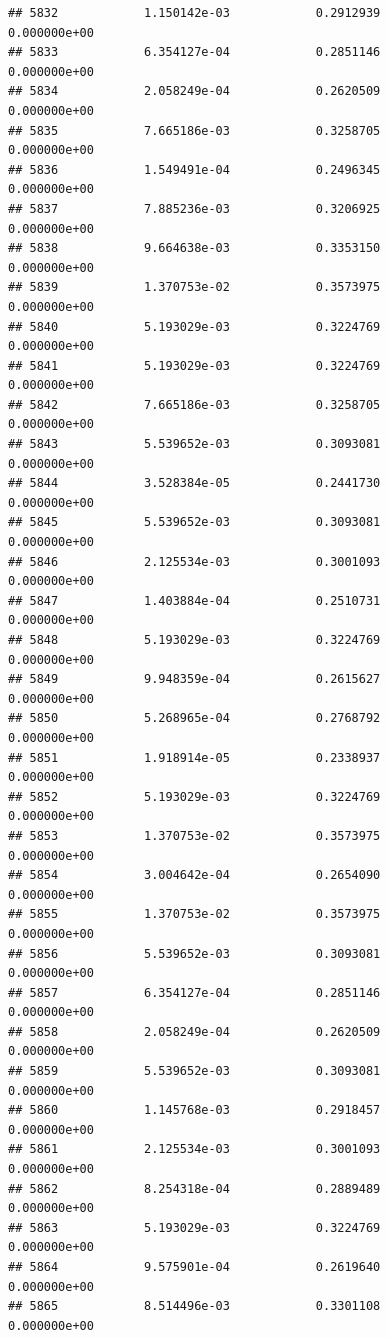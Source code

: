 \documentclass[
]{article}
\begin{document}
\begin{verbatim}
## 5832            1.150142e-03            0.2912939            0.000000e+00
## 5833            6.354127e-04            0.2851146            0.000000e+00
## 5834            2.058249e-04            0.2620509            0.000000e+00
## 5835            7.665186e-03            0.3258705            0.000000e+00
## 5836            1.549491e-04            0.2496345            0.000000e+00
## 5837            7.885236e-03            0.3206925            0.000000e+00
## 5838            9.664638e-03            0.3353150            0.000000e+00
## 5839            1.370753e-02            0.3573975            0.000000e+00
## 5840            5.193029e-03            0.3224769            0.000000e+00
## 5841            5.193029e-03            0.3224769            0.000000e+00
## 5842            7.665186e-03            0.3258705            0.000000e+00
## 5843            5.539652e-03            0.3093081            0.000000e+00
## 5844            3.528384e-05            0.2441730            0.000000e+00
## 5845            5.539652e-03            0.3093081            0.000000e+00
## 5846            2.125534e-03            0.3001093            0.000000e+00
## 5847            1.403884e-04            0.2510731            0.000000e+00
## 5848            5.193029e-03            0.3224769            0.000000e+00
## 5849            9.948359e-04            0.2615627            0.000000e+00
## 5850            5.268965e-04            0.2768792            0.000000e+00
## 5851            1.918914e-05            0.2338937            0.000000e+00
## 5852            5.193029e-03            0.3224769            0.000000e+00
## 5853            1.370753e-02            0.3573975            0.000000e+00
## 5854            3.004642e-04            0.2654090            0.000000e+00
## 5855            1.370753e-02            0.3573975            0.000000e+00
## 5856            5.539652e-03            0.3093081            0.000000e+00
## 5857            6.354127e-04            0.2851146            0.000000e+00
## 5858            2.058249e-04            0.2620509            0.000000e+00
## 5859            5.539652e-03            0.3093081            0.000000e+00
## 5860            1.145768e-03            0.2918457            0.000000e+00
## 5861            2.125534e-03            0.3001093            0.000000e+00
## 5862            8.254318e-04            0.2889489            0.000000e+00
## 5863            5.193029e-03            0.3224769            0.000000e+00
## 5864            9.575901e-04            0.2619640            0.000000e+00
## 5865            8.514496e-03            0.3301108            0.000000e+00

\end{verbatim}
\end{document}
